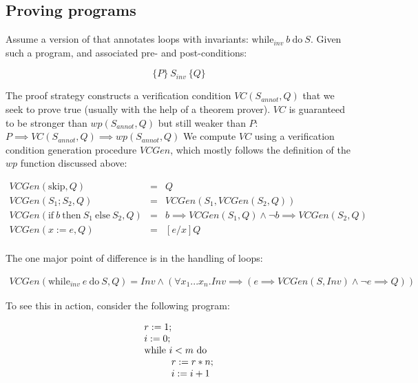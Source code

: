 \documentclass[11pt]{article}
\begin{document}
\subsection{Proving programs}

Assume a version of \WhileLang that annotates loops with invariants:
$\mbox{while}_{inv}~b~\mbox{do}~S$.
%
Given such a program, and associated pre- and post-conditions:

\[
\{ P \} ~ S_{inv}~ \{ Q \}
\]

The proof strategy constructs a verification condition $VC(S_{annot}, Q)$ that
we seek to prove true (usually with the help of a theorem prover).  $VC$ is
guaranteed to be stronger than $wp(S_{annot}, Q)$ but still weaker than $P$: $P
\implies VC(S_{annot}, Q) \implies wp(S_{annot}, Q)$ We compute $VC$ using a
verification condition generation procedure $VCGen$, which mostly follows the
definition of the $wp$ function discussed above:

\begin{center}
\[
\begin{array}{lcl}
VCGen(\mbox{skip}, Q) & = & Q \\
VCGen(S_1; S_2, Q) & = & VCGen(S_1, VCGen(S_2, Q)) \\
VCGen(\mbox{if}~b~\mbox{then}~S_1~\mbox{else}~S_2, Q) & = & b \implies VCGen(S_1, Q) \wedge \neg b \implies VCGen(S_2, Q) \\
VCGen(x := e, Q) & = & [e/x] Q \\
\end{array}
\]
\end{center}


The one major point of difference is in the handling of loops:

\begin{center}
\[
\begin{array}{l}
VCGen(\mbox{while}_{inv} ~e~\mbox{do}~S, Q) = Inv \wedge (\forall x_1 ... x_n . Inv \implies ( e \implies VCGen(S, Inv) \wedge \neg e \implies Q) )
\end{array}
\]
\end{center}


To see this in action, consider the following \WhileLang program:

\[
\begin{array}{l}
r := 1;\\
i := 0;\\
\mbox{while}~ i<m ~\mbox{do} \\
\hspace{1cm} r:=r*n; \\
\hspace{1cm} i:=i+1
\end{array}
\]
\end{document}
